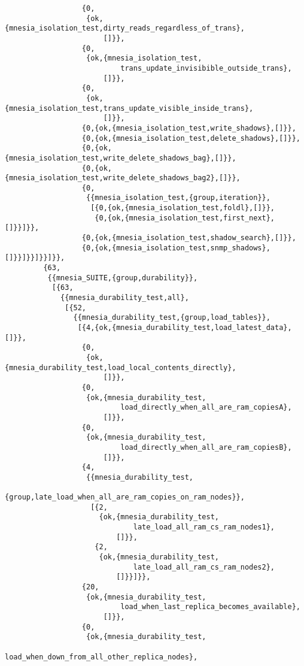 \begin{verbatim}
                  {0,
                   {ok,{mnesia_isolation_test,dirty_reads_regardless_of_trans},
                       []}},
                  {0,
                   {ok,{mnesia_isolation_test,
                           trans_update_invisibible_outside_trans},
                       []}},
                  {0,
                   {ok,{mnesia_isolation_test,trans_update_visible_inside_trans},
                       []}},
                  {0,{ok,{mnesia_isolation_test,write_shadows},[]}},
                  {0,{ok,{mnesia_isolation_test,delete_shadows},[]}},
                  {0,{ok,{mnesia_isolation_test,write_delete_shadows_bag},[]}},
                  {0,{ok,{mnesia_isolation_test,write_delete_shadows_bag2},[]}},
                  {0,
                   {{mnesia_isolation_test,{group,iteration}},
                    [{0,{ok,{mnesia_isolation_test,foldl},[]}},
                     {0,{ok,{mnesia_isolation_test,first_next},[]}}]}},
                  {0,{ok,{mnesia_isolation_test,shadow_search},[]}},
                  {0,{ok,{mnesia_isolation_test,snmp_shadows},[]}}]}}]}}]}},
         {63,
          {{mnesia_SUITE,{group,durability}},
           [{63,
             {{mnesia_durability_test,all},
              [{52,
                {{mnesia_durability_test,{group,load_tables}},
                 [{4,{ok,{mnesia_durability_test,load_latest_data},[]}},
                  {0,
                   {ok,{mnesia_durability_test,load_local_contents_directly},
                       []}},
                  {0,
                   {ok,{mnesia_durability_test,
                           load_directly_when_all_are_ram_copiesA},
                       []}},
                  {0,
                   {ok,{mnesia_durability_test,
                           load_directly_when_all_are_ram_copiesB},
                       []}},
                  {4,
                   {{mnesia_durability_test,
                        {group,late_load_when_all_are_ram_copies_on_ram_nodes}},
                    [{2,
                      {ok,{mnesia_durability_test,
                              late_load_all_ram_cs_ram_nodes1},
                          []}},
                     {2,
                      {ok,{mnesia_durability_test,
                              late_load_all_ram_cs_ram_nodes2},
                          []}}]}},
                  {20,
                   {ok,{mnesia_durability_test,
                           load_when_last_replica_becomes_available},
                       []}},
                  {0,
                   {ok,{mnesia_durability_test,
                           load_when_down_from_all_other_replica_nodes},

\end{verbatim}
